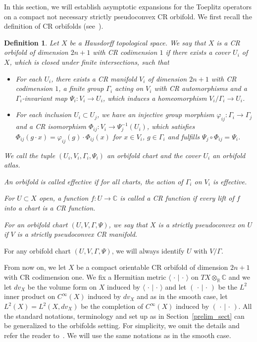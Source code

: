 \documentclass{article}
\newtheorem{definition}[theorem]{Definition}
\begin{document}
In this section, we will establish asymptotic expansions for the Toeplitz operators on a compact not necessary strictly pseudoconvex CR orbifold. We first recall the definition of CR orbifolds (see~\cite[Section 5]{khh}). 

\begin{definition}\label{d-gue181015}
Let $X$ be a Hausdorff topological space. 
We say that $X$ is a CR orbifold of dimension $2n+1$ with CR codimension $1$ if there exists a cover $U_i$ of $X$, which is closed under finite intersections, such that
\begin{itemize}
\item For each $U_i$, there exists a CR manifold $V_i$ of dimension $2n+1$ with CR codimension $1$, a finite group $\Gamma_i$ acting on $V_i$ with CR automorphisms and a $\Gamma_i$-invariant map $\Psi_i \colon V_i \rightarrow U_i$, which induces a homeomorphism $V_i / \Gamma_i \rightarrow U_i$. 
\item For each inclusion $U_i \subset U_j$, we have an injective group morphism $\varphi_{ij} \colon \Gamma_i \rightarrow \Gamma_j$ and a CR isomorphism $\Phi_{ij} \colon V_i \rightarrow \Psi_j^{-1}(U_i)$, which satisfies $\Phi_{ij}(g\cdot x) = \varphi_{ij} (g)\cdot\Phi_{ij} (x)$ for $x \in V_i$, $g \in \Gamma_i$ and fulfills $\Psi_j \circ \Phi_{ij} = \Psi_i$.
\end{itemize}
We call the tuple $(U_i, V_i, \Gamma_i, \Psi_i)$ an orbifold chart and the cover $U_i$ an orbifold atlas.

An orbifold is called effective if for all charts, the action of $\Gamma_i$ on $V_i$ is effective.

For $U \subset X$ open, a function $f \colon U \rightarrow \mathbb C$ is called a CR function if every lift of $f$ into a chart is a CR function. 

For an orbifold chart $(U, V, \Gamma, \Psi)$, we say that $X$ is a strictly pseudoconvex on $U$ if $V$ is a strictly pseudoconvex CR manifold. 
\end{definition}


For any orbifold chart $(U, V, \Gamma, \Psi)$, we will always identify $U$ with $V/\Gamma$. 

From now on, we let $X$ be a compact orientable CR orbifold of dimension $2n+1$ with CR codimension one. 
We fix a Hermitian metric $\langle\,\cdot\,|\,\cdot\,\rangle$ on $TX\otimes_{\mathbb R}\mathbb C$ and we let $dv_X$ be the volume form on $X$ induced by $\langle\,\cdot\,|\,\cdot\,\rangle$ and let $(\,\cdot\,|\,\cdot\,)$ be the $L^2$ inner product on $C^\infty(X)$ induced by $dv_X$ and as in the smooth case, let $L^2(X)=L^2(X,dv_X)$ be the completion of $C^\infty(X)$ induced by $(\,\cdot\,|\,\cdot\,)$. All the standard notations, terminology and set up as in Section~\ref{prelim_sect} can be generalized to the orbifolds setting. For simplicity, we omit the details and refer the reader to~\cite{gh3}. We will use the same notations as in the smooth case. 
\end{document}
